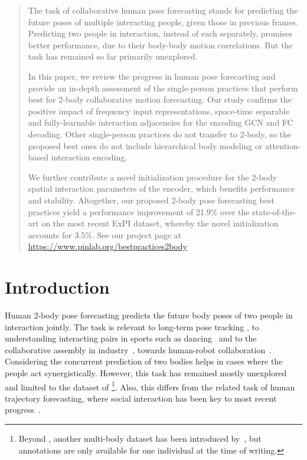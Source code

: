 \documentclass[10pt,twocolumn,letterpaper]{article}
\begin{document}
\begin{abstract}

The task of collaborative human pose forecasting stands for predicting the future poses of multiple interacting people, given those in previous frames.
Predicting two people in interaction, instead of each separately, promises better performance, due to their body-body motion correlations. But the task has remained so far primarily unexplored.

In this paper, we review the progress in human pose forecasting and provide an in-depth assessment of the single-person practices that perform best for 2-body collaborative motion forecasting.
Our study confirms the positive impact of frequency input representations, space-time separable and fully-learnable interaction adjacencies for the encoding GCN and FC decoding.
Other single-person practices do not transfer to 2-body, so the proposed best ones do not include hierarchical body modeling or attention-based interaction encoding.

We further contribute a novel initialization procedure for the 2-body spatial interaction parameters of the encoder, which benefits performance and stability. 
Altogether, our proposed 2-body pose forecasting best practices yield a performance improvement of 21.9\% over the state-of-the-art on the most recent ExPI dataset, whereby the novel initialization accounts for 3.5\%.
See our project page at 
\href{https://www.pinlab.org/bestpractices2body}{https://www.pinlab.org/bestpractices2body}
\end{abstract}

 
\section{Introduction}
\label{sec:introduction}

Human 2-body pose forecasting predicts the future body poses of two people in interaction jointly. The task is relevant to long-term pose tracking \cite{Andriluka2018PoseTrackAB}, to understanding interacting pairs in sports such as dancing~\cite{guo21} and to the collaborative assembly in industry~\cite{Duarte18,koppula21}, towards human-robot collaboration~\cite{sampieri22}.
Considering the concurrent prediction of two bodies helps in cases where the people act synergistically.
However, this task has remained mostly unexplored and limited to the dataset of \cite{guo21}\footnote{Beyond \cite{guo21}, another multi-body dataset has been introduced by~\cite{Fieraru_2020_CVPR}, but annotations are only available for one individual at the time of writing.}.
Also, this differs from the related task of human trajectory forecasting, where  social interaction has been key to most recent progress~\cite{monti21dag, Kothari22, yuan2021agent, Abduallah22}.
\end{document}

